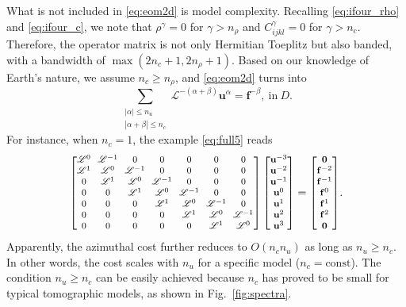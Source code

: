 \documentclass[extra]{gji}
\begin{document}
What is not included in \eqref{eq:eom2d} is model complexity. 
Recalling \eqref{eq:ifour_rho} and \eqref{eq:ifour_c}, 
we note that $\rho^\gamma=0$ for $\gamma>n_\rho$ and 
$C_{ijkl}^\gamma=0$ for $\gamma>n_c$.
Therefore, the operator matrix is not only Hermitian Toeplitz 
but also banded, with a bandwidth of $\max\left(2n_c+1,2n_\rho+1\right)$. 
Based on our knowledge of Earth's nature, we assume $n_c\ge n_\rho$, 
and \eqref{eq:eom2d} turns into
\begin{equation}
  \sum_{\substack{|\alpha|\le n_u\\|\alpha+\beta|\le n_c}}
  \mathscr{L}^{-\left(\alpha+\beta\right)}\mathbf{u}^\alpha=\mathbf{f}^{-\beta},
  \ \text{in}\ D.
  \label{eq:band2d}
\end{equation}
For instance, when $n_c=1$, the example \eqref{eq:full5} reads
\begin{equation}
  {\footnotesize
  \setlength{\arraycolsep}{3pt}
  \begin{bmatrix}
  \mathscr{L}^{0} & \mathscr{L}^{-1} & 0 & 0 & 0 & 0 & 0\\
  \mathscr{L}^{1} & \mathscr{L}^{0} & \mathscr{L}^{-1} & 0 & 0 & 0 & 0\\
  0 & \mathscr{L}^{1} & \mathscr{L}^{0} & \mathscr{L}^{-1} & 0 & 0 & 0\\
  0 & 0 & \mathscr{L}^{1} & \mathscr{L}^{0} & \mathscr{L}^{-1} & 0 & 0\\
  0 & 0 & 0 & \mathscr{L}^{1} & \mathscr{L}^{0} & \mathscr{L}^{-1} & 0\\
  0 & 0 & 0 & 0 & \mathscr{L}^{1} & \mathscr{L}^{0} & \mathscr{L}^{-1}\\
  0 & 0 & 0 & 0 & 0 & \mathscr{L}^{1} & \mathscr{L}^{0}\\
  \end{bmatrix}\begin{bmatrix}
  \mathbf{u}^{-3}\\
  \mathbf{u}^{-2}\\
  \mathbf{u}^{-1}\\
  \mathbf{u}^{0}\\
  \mathbf{u}^{1}\\
  \mathbf{u}^{2}\\
  \mathbf{u}^{3}
  \end{bmatrix}=\begin{bmatrix}
  \mathbf{0}\\
  \mathbf{f}^{-2}\\
  \mathbf{f}^{-1}\\
  \mathbf{f}^{0}\\
  \mathbf{f}^{1}\\
  \mathbf{f}^{2}\\
  \mathbf{0}
  \end{bmatrix}}.
  \label{eq:band5}
\end{equation}
Apparently, the azimuthal cost further reduces to $O\left(n_c n_u\right)$ 
as long as $n_u \ge n_c$. In other words, the cost scales with $n_u$ 
for a specific model ($n_c=\text{const}$).
The condition $n_u \ge n_c$ can be easily achieved because $n_c$ has proved to
be small for typical tomographic models, as shown in Fig.~\ref{fig:spectra}. 
\end{document}

